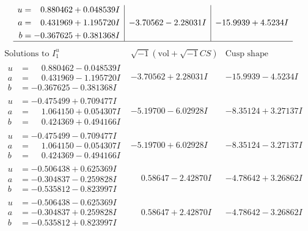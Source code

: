 \documentclass[1p]{elsarticle_modified}
\theoremstyle{definition}
\newcommand{\I}{\sqrt{-1}}
\begin{document}
$$\begin{array}{c|c|c}
\begin{aligned}
u &= \phantom{-}0.880462 + 0.048539 I \\
a &= \phantom{-}0.431969 + 1.195720 I \\
b &= -0.367625 + 0.381368 I\end{aligned}
 & -3.70562 - 2.28031 I & -15.9939 + 4.5234 I\\
 \hline 
 \end{array}$$\newpage$$\begin{array}{c|c|c}  
\text{Solutions to }I^u_{1}& \I (\text{vol} + \sqrt{-1}CS) & \text{Cusp shape}\\
 \hline 
\begin{aligned}
u &= \phantom{-}0.880462 - 0.048539 I \\
a &= \phantom{-}0.431969 - 1.195720 I \\
b &= -0.367625 - 0.381368 I\end{aligned}
 & -3.70562 + 2.28031 I & -15.9939 - 4.5234 I \\ \hline\begin{aligned}
u &= -0.475499 + 0.709477 I \\
a &= \phantom{-}1.064150 + 0.054307 I \\
b &= \phantom{-}0.424369 + 0.494166 I\end{aligned}
 & -5.19700 - 6.02928 I & -8.35124 + 3.27137 I \\ \hline\begin{aligned}
u &= -0.475499 - 0.709477 I \\
a &= \phantom{-}1.064150 - 0.054307 I \\
b &= \phantom{-}0.424369 - 0.494166 I\end{aligned}
 & -5.19700 + 6.02928 I & -8.35124 - 3.27137 I \\ \hline\begin{aligned}
u &= -0.506438 + 0.625369 I \\
a &= -0.304837 - 0.259828 I \\
b &= -0.535812 - 0.823997 I\end{aligned}
 & \phantom{-}0.58647 - 2.42870 I & -4.78642 + 3.26862 I \\ \hline\begin{aligned}
u &= -0.506438 - 0.625369 I \\
a &= -0.304837 + 0.259828 I \\
b &= -0.535812 + 0.823997 I\end{aligned}
 & \phantom{-}0.58647 + 2.42870 I & -4.78642 - 3.26862 I \\ \hline\begin{aligned}

\end{aligned}
\end{array}$$
\end{document}
